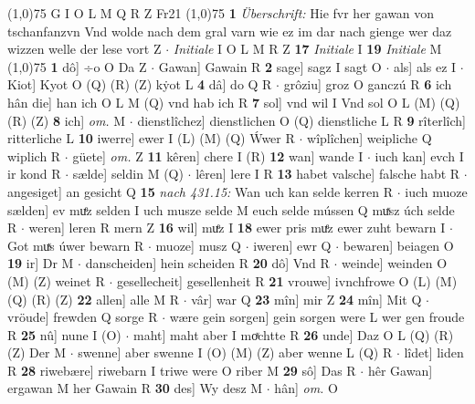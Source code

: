 \documentclass[8pt,a4paper,notitlepage]{article}
\begin{document}
\begin{table}[ht]
\begin{minipage}[t]{0.5\linewidth}
\begin{tabular}{rl}
\end{tabular}
\scriptsize
\line(1,0){75} \newline
G I O L M Q R Z Fr21 \newline
\line(1,0){75} \newline
\textbf{1} \textit{Überschrift:} Hie fvr her gawan von tschanfanzvn Vnd wolde nach dem gral varn wie ez im dar nach gienge wer daz wizzen welle der lese vort Z   $\cdot$ \textit{Initiale} I O L M R Z  \textbf{17} \textit{Initiale} I  \textbf{19} \textit{Initiale} M  \newline
\line(1,0){75} \newline
\textbf{1} dô] ÷o O Da Z  $\cdot$ Gawan] Gawain R \textbf{2} sage] sagz I sagt O  $\cdot$ als] als ez I  $\cdot$ Kiot] Kyot O (Q) (R) (Z) kẏot L \textbf{4} dâ] do Q R  $\cdot$ grôziu] groz O ganczú R \textbf{6} ich hân die] han ich O L M (Q) vnd hab ich R \textbf{7} sol] vnd wil I Vnd sol O L (M) (Q) (R) (Z) \textbf{8} ich] \textit{om.} M  $\cdot$ dienstlîchez] dienstlichen O (Q) dienstliche L R \textbf{9} rîterlîch] ritterliche L \textbf{10} iwerre] ewer I (L) (M) (Q) Ẃwer R  $\cdot$ wîplîchen] weipliche Q wiplich R  $\cdot$ güete] \textit{om.} Z \textbf{11} kêren] chere I (R) \textbf{12} wan] wande I  $\cdot$ iuch kan] evch I ir kond R  $\cdot$ sælde] seldin M (Q)  $\cdot$ lêren] lere I R \textbf{13} habet valsche] falsche habt R  $\cdot$ angesiget] an gesicht Q \textbf{15} \textit{nach 431.15:} Wan uch kan selde kerren R   $\cdot$ iuch muoze sælden] ev muͤz selden I uch musze selde M euch selde mússen Q muͯsz úch selde R  $\cdot$ weren] leren R mern Z \textbf{16} wil] muͤz I \textbf{18} ewer pris muͤz ewer zuht bewarn I  $\cdot$ Got muͯs úwer bewarn R  $\cdot$ muoze] musz Q  $\cdot$ iweren] ewr Q  $\cdot$ bewaren] beiagen O \textbf{19} ir] Dr M  $\cdot$ danscheiden] hein scheiden R \textbf{20} dô] Vnd R  $\cdot$ weinde] weinden O (M) (Z) weinet R  $\cdot$ gesellecheit] gesellenheit R \textbf{21} vrouwe] ivnchfrowe O (L) (M) (Q) (R) (Z) \textbf{22} allen] alle M R  $\cdot$ vâr] war Q \textbf{23} mîn] mir Z \textbf{24} mîn] Mit Q  $\cdot$ vröude] frewden Q sorge R  $\cdot$ wære gein sorgen] gein sorgen were L wer gen froude R \textbf{25} nû] nune I (O)  $\cdot$ maht] maht aber I moͯchtte R \textbf{26} unde] Daz O L (Q) (R) (Z) Der M  $\cdot$ swenne] aber swenne I (O) (M) (Z) aber wenne L (Q) R  $\cdot$ lîdet] liden R \textbf{28} riwebære] riwebarn I triwe were O riber M \textbf{29} sô] Das R  $\cdot$ hêr Gawan] ergawan M her Gawain R \textbf{30} des] Wy desz M  $\cdot$ hân] \textit{om.} O \newline

\end{minipage}
\end{table}
\end{document}

